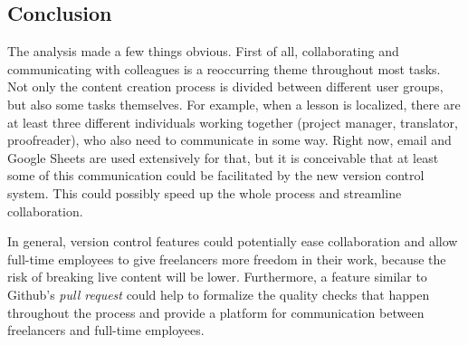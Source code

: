 \subsection{Conclusion}
The analysis made a few things obvious. First of all, collaborating and communicating with colleagues is a reoccurring theme throughout most tasks. Not only the content creation process is divided between different user groups, but also some tasks themselves. For example, when a lesson is localized, there are at least three different individuals working together (project manager, translator, proofreader), who also need to communicate in some way. Right now, email and Google Sheets are used extensively for that, but it is conceivable that at least some of this communication could be facilitated by the new version control system. This could possibly speed up the whole process and streamline collaboration.


In general, version control features could potentially ease collaboration and allow full-time employees to give freelancers more freedom in their work, because the risk of breaking live content will be lower. Furthermore, a feature similar to Github's \textit{pull request} could help to formalize the quality checks that happen throughout the process and provide a platform for communication between freelancers and full-time employees.
